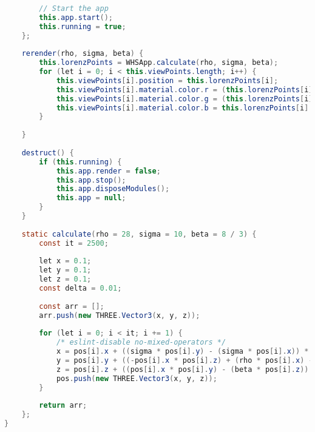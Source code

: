 \begin{lstlisting}[style=C, language=Java, caption=App.js]
		
		// Start the app
		this.app.start();
		this.running = true;
	};
	
	rerender(rho, sigma, beta) {
		this.lorenzPoints = WHSApp.calculate(rho, sigma, beta);
		for (let i = 0; i < this.viewPoints.length; i++) {
			this.viewPoints[i].position = this.lorenzPoints[i];
			this.viewPoints[i].material.color.r = (this.lorenzPoints[i].x+10)/20;
			this.viewPoints[i].material.color.g = (this.lorenzPoints[i].y+10)/20;
			this.viewPoints[i].material.color.b = this.lorenzPoints[i].z/30;
		}
	
	}
	
	destruct() {
		if (this.running) {
			this.app.render = false;
			this.app.stop();
			this.app.disposeModules();
			this.app = null;
		}
	}
	
	static calculate(rho = 28, sigma = 10, beta = 8 / 3) {
		const it = 2500;
		
		let x = 0.1;
		let y = 0.1;
		let z = 0.1;
		const delta = 0.01;
		
		const arr = [];
		arr.push(new THREE.Vector3(x, y, z));
		
		for (let i = 0; i < it; i += 1) {
			/* eslint-disable no-mixed-operators */
			x = pos[i].x + ((sigma * pos[i].y) - (sigma * pos[i].x)) * delta;
			y = pos[i].y + ((-pos[i].x * pos[i].z) + (rho * pos[i].x) - pos[i].y) * delta;
			z = pos[i].z + ((pos[i].x * pos[i].y) - (beta * pos[i].z)) * delta;
			pos.push(new THREE.Vector3(x, y, z));
		}
		
		return arr;
	};
}
\end{lstlisting}

